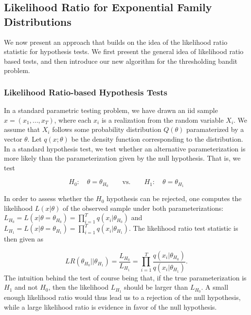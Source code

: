 \documentclass[12pt,]{article}
\begin{document}
\subsection{\texorpdfstring{Likelihood Ratio for Exponential Family
Distributions
\label{sec:LikelihoodRatioForExponentialFamily}}{Likelihood Ratio for Exponential Family Distributions }}\label{likelihood-ratio-for-exponential-family-distributions}

We now present an approach that builds on the idea of the likelihood
ratio statistic for hypothesis tests. We first present the general idea
of likelihood ratio based tests, and then introduce our new algorithm
for the thresholding bandit problem.

\subsubsection{Likelihood Ratio-based Hypothesis
Tests}\label{likelihood-ratio-based-hypothesis-tests}

In a standard parametric testing problem, we have drawn an iid sample
\(x = (x_1, ..., x_T)\), where each \(x_i\) is a realization from the
random variable \(X_i\). We assume that \(X_i\) follows some probability
distribution \(Q(\theta)\) paramaterized by a vector \(\theta\). Let
\(q(x;\theta)\) be the density function corresponding to the
distribution. In a standard hypothesis test, we test whether an
alternative parameterization is more likely than the parameterization
given by the null hypothesis. That is, we test

\[
H_0: \quad \theta = \theta_{H_0} \qquad \text{vs.} \qquad H_1: \quad \theta = \theta_{H_1}
\]

In order to assess whether the \(H_0\) hypothesis can be rejected, one
computes the likelihood \(L(x|\theta)\) of the observed sample under
both parameterizations:
\(L_{H_0} = L(x|\theta = \theta_{H_0}) = \prod_{i=1}^T q(x_i|\theta_{H_0})\)
and
\(L_{H_1} = L(x|\theta = \theta_{H_1}) = \prod_{i=1}^T q(x_i|\theta_{H_1})\).
The likelihood ratio test statistic is then given as

\[
LR(\theta_{H_0}|| \theta_{H_1}) = \frac{L_{H_0}}{L_{H_1}} = \prod_{i=1}^T\frac{q(x_i|\theta_{H_0})}{ q(x_i|\theta_{H_1})}.
\] The intuition behind the test of course being that, if the true
parameterization is \(H_1\) and not \(H_0\), then the likelihood
\(L_{H_1}\) should be larger than \(L_{H_0}\). A small enough likelihood
ratio would thus lead us to a rejection of the null hypothesis, while a
large likelihood ratio is evidence in favor of the null hypothesis.
\end{document}
